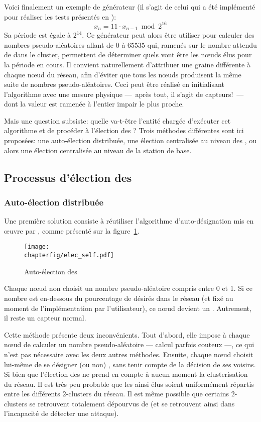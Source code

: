Voici finalement un exemple de générateur (il s'agit de celui qui a été implémenté pour réaliser les tests présentés en ):
\[x_n=11\cdot x_{n-1}\bmod2^{16}\]
Sa période est égale à $2^{14}$.
Ce générateur peut alors être utiliser pour calculer des nombres pseudo-aléatoires allant de $0$ à $65535$ qui, ramenés sur le nombre attendu de \cns dans le cluster, permettent de déterminer quels vont être les nœuds élus pour la période en cours.
Il convient naturellement d'attribuer une graine différente à chaque nœud du réseau, afin d'éviter que tous les nœuds produisent la même suite de nombres pseudo-aléatoires.
Ceci peut être réalisé en initialisant l'algorithme avec une mesure physique ---~après tout, il s'agit de capteurs!~--- dont la valeur est ramenée à l'entier impair le plus proche.

Mais une question subsiste: quelle va-t-être l'entité chargée d'exécuter cet algorithme et de procéder à l'élection des \cns?
Trois méthodes différentes sont ici proposées: une auto-élection distribuée, une élection centralisée au niveau des \CH, ou alors une élection centralisée au niveau de la station de base.
    \subsection{Processus d'élection des \cns}

        \subsubsection{Auto-élection distribuée}
Une première solution consiste à réutiliser l'algorithme d'auto-désignation mis en œuvre par \leach, comme présenté sur la figure~\ref{sa:fig:elecself}.
\begin{figure}[ht]
    \centering
    \texttt{[image: \\chapterfig/elec\_self.pdf]}
    \caption{Auto-élection des \cns}\label{sa:fig:elecself}
\end{figure}
Chaque nœud non \CH choisit un nombre pseudo-aléatoire compris entre 0 et 1.
Si ce nombre est en-dessous du pourcentage de \cns désirés dans le réseau (et fixé au moment de l'implémentation par l'utilisateur), ce nœud devient un \cn.
Autrement, il reste un capteur normal.

Cette méthode présente deux inconvénients.
Tout d'abord, elle impose à chaque nœud de calculer un nombre pseudo-aléatoire --- calcul parfois couteux ---, ce qui n'est pas nécessaire avec les deux autres méthodes.
Ensuite, chaque nœud choisit lui-même de se désigner (ou non) \cn, sans tenir compte de la décision de ses voisins.
Si bien que l'élection des \cns ne prend en compte à aucun moment la clusterisation du réseau.
Il est très peu probable que les \cns ainsi élus soient uniformément répartis entre les différents $2$-clusters du réseau.
Il est même possible que certains $2$-clusters se retrouvent totalement dépourvus de \cns (et se retrouvent ainsi dans l'incapacité de détecter une attaque).

